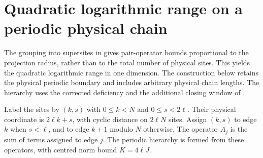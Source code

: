\section{Quadratic logarithmic range on a periodic physical chain}
\label{sec:hastings_periodic_coarsening}

The grouping into supersites in
\cite[lines 609--639]{Hastings2006Solving} gives pair-operator bounds
proportional to the projection radius, rather than to the total number
of physical sites. This yields the quadratic logarithmic range in one
dimension. The construction below retains the physical periodic boundary
and includes arbitrary physical chain lengths. The hierarchy uses the
corrected deficiency and the additional closing window of
\cite{gap:hastings05_hierarchical_projection,gap:hastings05_hierarchical_energy}.

\begin{definition}
    \label{def:hastings_regular_periodic_grouping}
    \leanok
    Label the sites by $(k,s)$ with $0\le k<N$ and $0\le s<2\ell$.
    Their physical coordinate is $2\ell k+s$, with cyclic distance on
    $2\ell N$ sites. Assign $(k,s)$ to edge $k$ when $s<\ell$, and to
    edge $k+1$ modulo $N$ otherwise. The operator $A_j$ is the sum of
    terms assigned to edge $j$. The periodic hierarchy is formed from
    these operators, with centred norm bound $K=4\ell J$.
\end{definition}

